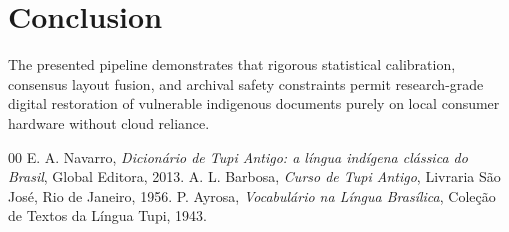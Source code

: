 \documentclass[conference]{IEEEtran}
\begin{document}
\section{Conclusion}
The presented pipeline demonstrates that rigorous statistical calibration, consensus layout fusion, and archival safety constraints permit research-grade digital restoration of vulnerable indigenous documents purely on local consumer hardware without cloud reliance.

\begin{thebibliography}{00}
 E. A. Navarro, \emph{Dicionário de Tupi Antigo: a língua indígena clássica do Brasil}, Global Editora, 2013.
 A. L. Barbosa, \emph{Curso de Tupi Antigo}, Livraria São José, Rio de Janeiro, 1956.
 P. Ayrosa, \emph{Vocabulário na Língua Brasílica}, Coleção de Textos da Língua Tupi, 1943.
\end{thebibliography}
\end{document}

